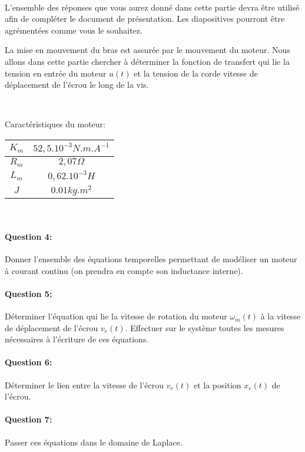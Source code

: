~\

L'ensemble des réponses que vous aurez donné dans cette partie devra être utilisé afin de compléter le document de présentation. Les diapositives pourront être agrémentées comme vous le souhaitez.

\ifdef{\public}{\cleardoublepage}{\newpage}


La mise en mouvement du bras est assurée par le mouvement du moteur. Nous allons dans cette partie chercher à déterminer la fonction de transfert qui lie la tension en entrée du moteur $u(t)$ et la tension de la corde vitesse de déplacement de l'écrou le long de la vis.

~\

Caractéristiques du moteur:
\begin{tabular}{|c|c|}
\hline
$K_m$ & $52,5.10^{-3}N.m.A^{-1}$ \\
\hline
$R_m$ & $2,07\Omega$ \\
\hline
$L_m$ & $0,62.10^{-3}H$ \\
\hline
$J$ & $0.01kg.m^2$ \\
\hline
\end{tabular}

~\

\paragraph{Question 4:} Donner l'ensemble des équations temporelles permettant de modéliser un moteur à courant continu (on prendra en compte son inductance interne).

\paragraph{Question 5:} Déterminer l'équation qui lie la vitesse de rotation du moteur $\omega_m(t)$ à la vitesse de déplacement de l'écrou $v_e(t)$. Effectuer sur le système toutes les mesures nécessaires à l'écriture de ces équations.

\paragraph{Question 6:} Déterminer le lien entre la vitesse de l'écrou $v_e(t)$ et la position $x_e(t)$ de l'écrou.

\paragraph{Question 7:} Passer ces équations dans le domaine de Laplace.

